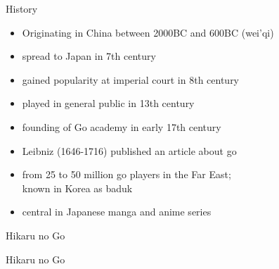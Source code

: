 \documentclass{prosper}
\begin{document}
\begin{slide}{History}
\begin{itemize}
\item  Originating in China between 2000BC and 600BC (wei'qi)
\item spread to Japan in 7th century
\item gained popularity at imperial court in 8th century
\item played in general public in 13th century
\item founding of Go academy in early 17th century
\item Leibniz (1646-1716) published an article about go
\item from 25 to 50 million go players in the Far East; \\
      known in Korea as baduk
\item central in Japanese manga and anime series
\end{itemize}
\end{slide}%

\begin{slide}{Hikaru no Go}\
\epsfxsize=5cm
\end{slide}

\begin{slide}{Hikaru no Go}\
\epsfxsize=5cm
\end{slide}

\end{document}
